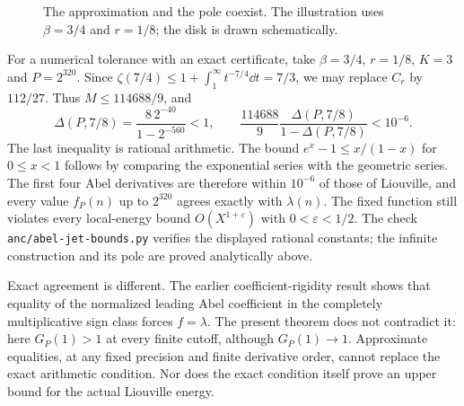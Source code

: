 \begin{figure}[tb]
\centering
{}
\caption{The approximation and the pole coexist. The illustration uses
$\beta=3/4$ and $r=1/8$; the disk is drawn schematically.}
\label{fig:abel-jet-disk}
\end{figure}

For a numerical tolerance with an exact certificate, take
$\beta=3/4$, $r=1/8$, $K=3$ and $P=2^{320}$. Since
$\zeta(7/4)\le1+\int_1^\infty t^{-7/4}\dd t=7/3$,
we may replace $C_r$ by $112/27$. Thus $M\le114688/9$, and
\[
 \Delta(P,7/8)=\frac{8\,2^{-40}}{1-2^{-560}}<1,\qquad
 \frac{114688}{9}\frac{\Delta(P,7/8)}{1-\Delta(P,7/8)}<10^{-6}.
\]
The last inequality is rational arithmetic. The bound
$e^x-1\le x/(1-x)$ for $0\le x<1$ follows by comparing the
exponential series with the geometric series. The first four Abel
derivatives are therefore within $10^{-6}$ of those of Liouville,
and every value $f_P(n)$ up to $2^{320}$ agrees exactly with
$\lambda(n)$. The fixed function still violates every local-energy
bound $O(X^{1+\varepsilon})$ with $0<\varepsilon<1/2$.
The check \texttt{anc/abel-jet-bounds.py} verifies the displayed
rational constants; the infinite construction and its pole are
proved analytically above.

Exact agreement is different. The earlier coefficient-rigidity result
shows that equality of the normalized leading Abel coefficient in the
completely multiplicative sign class forces $f=\lambda$. The present
theorem does not contradict it: here $G_P(1)>1$ at every finite cutoff,
although $G_P(1)\to1$. Approximate equalities, at any fixed precision
and finite derivative order, cannot replace the exact arithmetic
condition. Nor does the exact condition itself prove an upper bound
for the actual Liouville energy.

